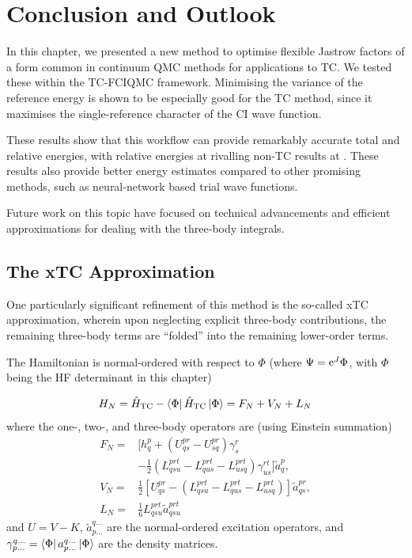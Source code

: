 \section{Conclusion and Outlook}

In this chapter, we presented a new method to optimise flexible Jastrow factors of a form common in continuum QMC methods for applications to TC. We tested these within the TC-FCIQMC framework. Minimising the variance of the reference energy is shown to be especially good for the TC method, since it maximises the single-reference character of the CI wave function.

These results show that this workflow can provide remarkably accurate total and relative energies, with relative energies at \vtz rivalling non-TC results at . These results also provide better energy estimates compared to other promising methods, such as neural-network based trial wave functions.\supercite{pfauInitio2020,hermannDeepneuralnetwork2020}

Future work on this topic have focused on technical advancements and efficient approximations for dealing with the three-body integrals.

\subsection{The xTC Approximation}

One particularly significant refinement of this method is the so-called \gls{xTC} approximation,\supercite{christlmaierXTC2023} wherein upon neglecting explicit three-body contributions, the remaining three-body terms are ``folded'' into the remaining lower-order terms.

The Hamiltonian is normal-ordered with respect to $\Phi$ (where $\Psi=\mathrm{e}^J\Phi$, with $\Phi$ being the HF determinant in this chapter)\supercite{kutzelniggNormal1997,kutzelniggCumulant1999}

\begin{equation}
    H_N = \hat H_\mathrm{TC} - \bra{\Phi}\hat H_\mathrm{TC}\ket\Phi = F_N + V_N + L_N
\end{equation}
where the one-, two-, and three-body operators are (using Einstein summation)
\begin{align}
F_N =& [h_q^p + (U_{qs}^{pr}-U_{sq}^{pr})\gamma_s^r \\
&- \frac 12 (L_{qsu}^{prt} - L_{qus}^{prt}-L_{usq}^{prt})\gamma_{us}^{rt}]
\tilde a_q^p, \\
V_N =& \frac 12[U_{qs}^{pr} - (L_{qsu}^{prt} - L_{qus}^{prt}-L_{usq}^{prt})]\tilde a_{qs}^{pr}, \\
L_N =& \frac 16L_{qsu}^{prt}\tilde a_{qsu}^{prt}
\end{align}
and $U=V-K$, $\tilde a_{p\dots}^{q\dots}$ are the normal-ordered
excitation operators, and $\gamma_{p\dots}^{q\dots}=\bra\Phi a_{p\dots}^{q\dots}\ket\Phi$ are the density matrices.

